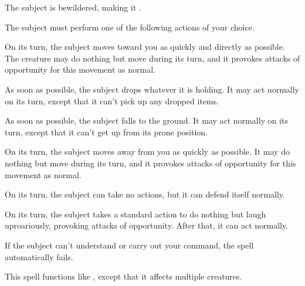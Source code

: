 \spellrng{\rngmed}
\begin{spellhealthy}
  The subject is bewildered, making it \vulnerable.
\end{spellhealthy}
\begin{spellblood}
  The subject must perform one of the following actions of your choice.
  \par {} On its turn, the subject moves toward you as quickly and directly as possible. The creature may do nothing but move during its turn, and it provokes attacks of opportunity for this movement as normal.
  \par {} As soon as possible, the subject drops whatever it is holding. It may act normally on its turn, except that it can't pick up any dropped items.
  \par {} As soon as possible, the subject falls to the ground. It may act normally on its turn, except that it can't get up from its prone position.
  \par {} On its turn, the subject moves away from you as quickly as possible. It may do nothing but move during its turn, and it provokes attacks of opportunity for this movement as normal.
  \par {} On its turn, the subject can take no actions, but it can defend itself normally.
  \par {} On its turn, the subject takes a standard action to do nothing but laugh uproariously, provoking attacks of opportunity. After that, it can act normally.
\end{spellblood}
\begin{spellnotes}
  If the subject can't understand or carry out your command, the spell automatically fails.
\end{spellnotes}

\begin{spelleffect}
  This spell functions like , except that it affects multiple creatures.
\end{spelleffect}

